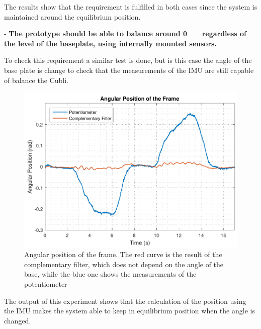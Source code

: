 The results show that the requirement is fulfilled in both cases since the system is maintained around the equilibrium position.

- \textbf{The prototype should be able to balance around \si{0\ \rad} regardless of the level of the baseplate, using internally mounted sensors.}

To check this requirement a similar test is done, but is this case the angle of the base plate is change to check that the measurements of the IMU are  still capable of balance the Cubli.
\begin{figure}[H]
	\centering
	\includegraphics[scale=0.65]{figures/testReq2}
	\caption{Angular position of the frame. The red curve is the result of the complementary filter, which does not depend on the angle of the base, while the blue one shows the measurements of the potentiometer}
	\label{testReq2}
\end{figure}\vspace{-5mm}
%
The output of this experiment shows that the calculation of the position using the IMU makes the system able to keep in equilibrium position when the angle is changed.


